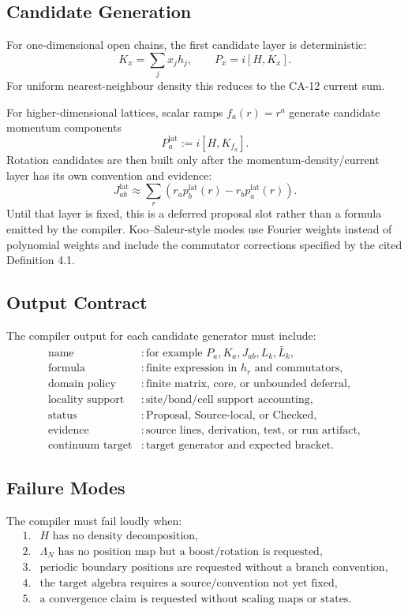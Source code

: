 \subsection{Candidate Generation}

For one-dimensional open chains, the first candidate layer is deterministic:
\[
  K_x=\sum_j x_jh_j,\qquad
  P_x=i[H,K_x].
\]
For uniform nearest-neighbour density this reduces to the CA-12 current sum.

For higher-dimensional lattices, scalar ramps \(f_a(r)=r^a\) generate candidate
momentum components
\[
  P_a^{\mathrm{lat}}:=i[H,K_{f_a}].
\]
Rotation candidates are then built only after the momentum-density/current layer
has its own convention and evidence:
\[
  J_{ab}^{\mathrm{lat}}
  \approx
  \sum_r(r_a p_b^{\mathrm{lat}}(r)-r_b p_a^{\mathrm{lat}}(r)).
\]
Until that layer is fixed, this is a deferred proposal slot rather than a
formula emitted by the compiler.
Koo--Saleur-style modes use Fourier weights instead of polynomial weights and
include the commutator corrections specified by the cited Definition 4.1.

\subsection{Output Contract}

The compiler output for each candidate generator must include:
\[
\begin{array}{ll}
\text{name} &: \text{for example }P_a,K_a,J_{ab},L_k,\bar L_k,\\
\text{formula} &: \text{finite expression in }h_r\text{ and commutators},\\
\text{domain policy} &: \text{finite matrix, core, or unbounded deferral},\\
\text{locality support} &: \text{site/bond/cell support accounting},\\
\text{status} &: \text{Proposal, Source-local, or Checked},\\
\text{evidence} &: \text{source lines, derivation, test, or run artifact},\\
\text{continuum target} &: \text{target generator and expected bracket}.
\end{array}
\]

\subsection{Failure Modes}

The compiler must fail loudly when:
\[
\begin{array}{ll}
1.&H\text{ has no density decomposition},\\
2.&\Lambda_N\text{ has no position map but a boost/rotation is requested},\\
3.&\text{periodic boundary positions are requested without a branch convention},\\
4.&\text{the target algebra requires a source/convention not yet fixed},\\
5.&\text{a convergence claim is requested without scaling maps or states}.
\end{array}
\]

